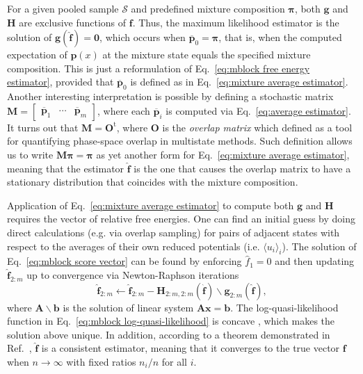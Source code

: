 \documentclass[journal=jctcce,manuscript=article,layout=twocolumn]{achemso}
\newcommand{\mt}[1]{\boldsymbol{\mathbf{#1}}}   %
\newcommand{\vt}[1]{\boldsymbol{\mathbf{#1}}}   %
\newcommand{\tr}[1]{#1^\text{t}}                %
\newcommand{\avg}[1]{\overline{#1}}             %
\begin{document}
For a given pooled sample $\mathcal S$ and predefined mixture composition $\vt \pi$, both $\vt g$ and $\mt H$ are exclusive functions of $\vt f$. Thus, the maximum likelihood estimator is the solution of $\vt g(\hat{\vt f}) = \vt 0$, which occurs when $\avg{\vt p}_0 = \vt \pi$, that is, when the computed expectation of $\vt p(x)$ at the mixture state equals the specified mixture composition. This is just a reformulation of Eq.~\eqref{eq:mblock free energy estimator}, provided that $\avg{\vt p}_0$ is defined as in Eq.~\eqref{eq:mixture average estimator}. Another interesting interpretation is possible by defining a stochastic matrix $\mt M = [\begin{array}{ccc} \avg{\vt p}_1 & \cdots & \avg{\vt p}_m \end{array}]$, where each $\avg{\vt p}_i$ is computed via Eq.~\eqref{eq:average estimator}. It turns out that $\mt M = \tr{\mt O}$, where $\mt O$ is the \textit{overlap matrix} which \citeauthor{Klimovich_2015} \cite{Klimovich_2015} defined as a tool for quantifying phase-space overlap in multistate methods. Such definition allows us to write $\mt M \vt \pi = \vt \pi$ as yet another form for Eq.~\eqref{eq:mixture average estimator}, meaning that the estimator $\hat{\vt f}$ is the one that causes the overlap matrix to have a stationary distribution that coincides with the mixture composition.

Application of Eq.~\eqref{eq:mixture average estimator} to compute both $\vt g$ and $\mt H$ requires the vector of relative free energies. One can find an initial guess by doing direct calculations (e.g. via overlap sampling\cite{Lee_1980, Lu_2003}) for pairs of adjacent states with respect to the averages of their own reduced potentials (i.e. $\langle u_i \rangle_i$). The solution of Eq.~\eqref{eq:mblock score vector} can be found by enforcing $\hat f_1 = 0$ and then updating $\hat{\vt f}_{2:m}$ up to convergence via Newton-Raphson iterations \cite{Shirts_2008}
\begin{equation*}
\label{eq:mblock Newton-Raphson}
\hat{\vt f}_{2:m} \leftarrow \hat{\vt f}_{2:m} - {\mt H}_{2:m,2:m}(\hat{\vt f}) \backslash {\vt g}_{2:m}(\hat{\vt f}),
\end{equation*}
where $\mt A \backslash \vt b$ is the solution of linear system $\mt A \vt x = \vt b$. The log-quasi-likelihood function in Eq.~\eqref{eq:mblock log-quasi-likelihood} is concave \cite{Doss_2014}, which makes the solution above unique. In addition, according to a theorem demonstrated in Ref.~, $\hat{\vt f}$ is a consistent estimator, meaning that it converges to the true vector $\vt f$ when $n \rightarrow \infty$ with fixed ratios $n_i/n$ for all $i$.
\end{document}
